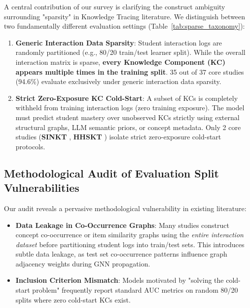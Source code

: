 \documentclass[journal]{IEEEtran}
\begin{document}
A central contribution of our survey is clarifying the construct ambiguity surrounding "sparsity" in Knowledge Tracing literature. We distinguish between two fundamentally different evaluation settings (Table~\ref{tab:sparse_taxonomy}):
\begin{enumerate}
    \item \textbf{Generic Interaction Data Sparsity}: Student interaction logs are randomly partitioned (e.g., 80/20 train/test learner split). While the overall interaction matrix is sparse, \textbf{every Knowledge Component (KC) appears multiple times in the training split}. 35 out of 37 core studies (94.6\%) evaluate exclusively under generic interaction data sparsity.
    \item \textbf{Strict Zero-Exposure KC Cold-Start}: A subset of KCs is completely withheld from training interaction logs (zero training exposure). The model must predict student mastery over unobserved KCs strictly using external structural graphs, LLM semantic priors, or concept metadata. Only 2 core studies (\textbf{SINKT} \cite{KT044_SINKT_2024}, \textbf{HHSKT} \cite{KT035_HHSKT_2023}) isolate strict zero-exposure cold-start protocols.
\end{enumerate}

\subsection{Methodological Audit of Evaluation Split Vulnerabilities}
Our audit reveals a pervasive methodological vulnerability in existing literature:
\begin{itemize}
    \item \textbf{Data Leakage in Co-Occurrence Graphs}: Many studies construct concept co-occurrence or item similarity graphs using the \emph{entire interaction dataset} before partitioning student logs into train/test sets. This introduces subtle data leakage, as test set co-occurrence patterns influence graph adjacency weights during GNN propagation.
    \item \textbf{Inclusion Criterion Mismatch}: Models motivated by "solving the cold-start problem" frequently report standard AUC metrics on random 80/20 splits where zero cold-start KCs exist.
\end{itemize}
\end{document}
